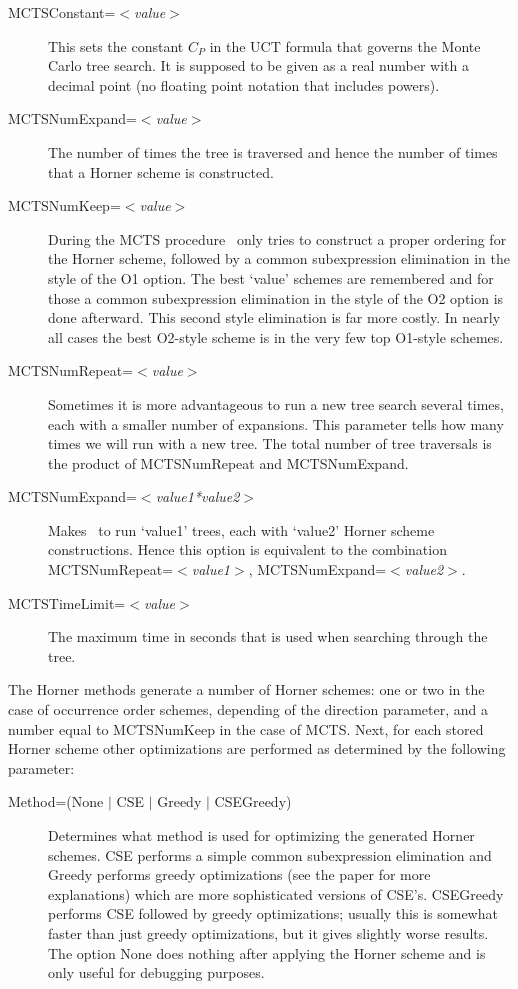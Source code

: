 \begin{description}
\item[MCTSConstant=$<$\emph{value}$>$] 
  This sets the constant $C_P$ in the UCT formula that governs 
  the Monte Carlo tree search. It is supposed to be given as a real number 
  with a decimal point (no floating point notation that includes powers).
\item[MCTSNumExpand=$<$\emph{value}$>$] The number of times the tree
  is traversed and hence the number of times that a Horner scheme is
  constructed.
\item[MCTSNumKeep=$<$\emph{value}$>$] 
  During the MCTS procedure \FORM\ only tries to construct 
  a proper ordering for the Horner scheme, followed by a common subexpression 
  elimination in the style of the O1 option. The best `value' schemes are 
  remembered and for those a common subexpression elimination in the style of 
  the O2 option is done afterward. This second style elimination is far more 
  costly. In nearly all cases the best O2-style scheme is in the very few top 
  O1-style schemes.
\item[MCTSNumRepeat=$<$\emph{value}$>$] 
  Sometimes it is more advantageous to run
  a new tree search several times, each with a smaller number of
  expansions. This parameter tells how many times we will run with a
  new tree. The total number of tree traversals is the product of 
  MCTSNumRepeat and MCTSNumExpand.
\item[MCTSNumExpand=$<$\emph{value1*value2}$>$] 
  Makes \FORM\ to run `value1' trees, each with `value2' Horner scheme
  constructions. Hence this option is equivalent to the combination \hfill \\
  MCTSNumRepeat=$<$\emph{value1}$>$, MCTSNumExpand=$<$\emph{value2}$>$.
\item[MCTSTimeLimit=$<$\emph{value}$>$] The maximum time in seconds
  that is used when searching through the tree.
\end{description}

The Horner methods generate a number of Horner schemes: one or two in
the case of occurrence order schemes, depending of the direction
parameter, and a number equal to MCTSNumKeep in the case of
MCTS. Next, for each stored Horner scheme other optimizations are
performed as determined by the following parameter:

\begin{description}
\item[Method=(None $|$ CSE $|$ Greedy $|$ CSEGreedy)] Determines what
method is used for optimizing the generated Horner schemes. 
CSE performs a simple 
common subexpression elimination and Greedy performs greedy 
optimizations (see the paper for more 
explanations) which are more sophisticated versions of CSE's. CSEGreedy 
performs CSE followed by greedy optimizations; usually this is somewhat 
faster than just greedy optimizations, but it gives slightly worse results. 
The option None does nothing after applying the Horner scheme and is only 
useful for debugging purposes.
\end{description}

